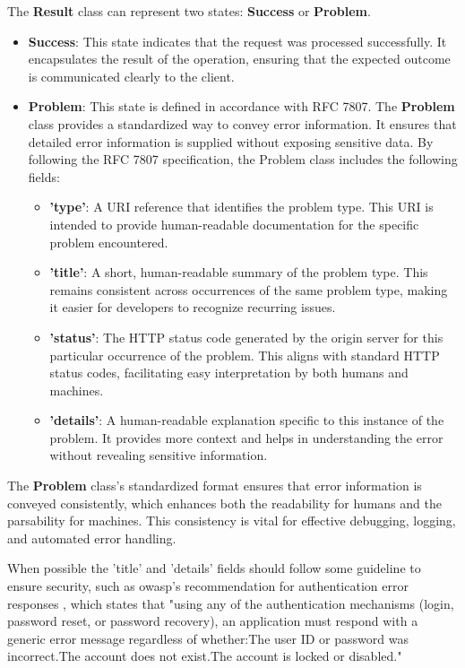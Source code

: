 The \textbf{Result} class can represent two states: \textbf{Success} or \textbf{Problem}.
\begin{itemize}
	\item \textbf{Success}: This state indicates that the request was processed successfully. It encapsulates the result of the operation, ensuring that the expected outcome is communicated clearly to the client.
	\item \textbf{Problem}: This state is defined in accordance with RFC 7807\cite{rfc7807}. The \textbf{Problem} class provides a standardized way to convey error information. It ensures that detailed error information is supplied without exposing sensitive data. By following the RFC 7807 specification, the Problem class includes the following fields:
	\begin{itemize}
		\item \textbf{'type'}: A URI reference that identifies the problem type. This URI is intended to provide human-readable documentation for the specific problem encountered.
		\item \textbf{'title'}: A short, human-readable summary of the problem type. This remains consistent across occurrences of the same problem type, making it easier for developers to recognize recurring issues.
		\item \textbf{'status'}:  The HTTP status code generated by the origin server for this particular occurrence of the problem. This aligns with standard HTTP status codes, facilitating easy interpretation by both humans and machines.
		\item \textbf{'details'}: A human-readable explanation specific to this instance of the problem. It provides more context and helps in understanding the error without revealing sensitive information.
	\end{itemize}
\end{itemize}

The \textbf{Problem} class's standardized format ensures that error information is conveyed consistently, which enhances both the readability for humans and the parsability for machines. This consistency is vital for effective debugging, logging, and automated error handling.

When possible the 'title' and 'details' fields should follow some guideline to ensure security, such as owasp's recommendation for authentication error responses \cite{owasp_authentication}, which states that "using any of the authentication mechanisms (login, password reset, or password recovery), an application must respond with a generic error message regardless of whether:The user ID or password was incorrect.The account does not exist.The account is locked or disabled."

